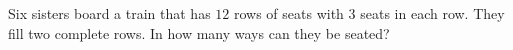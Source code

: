 Six sisters board a train that has $12$ rows of seats with $3$ seats in each row. They fill two complete rows. In how many ways can they be seated?
